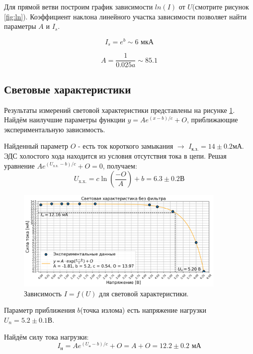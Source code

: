 \documentclass[a4paper, 12pt]{extarticle}
\begin{document}
Для прямой ветви построим график зависимости $ln(I)$ от $U$(смотрите рисунок \ref{fig:ln}).
Коэффициент наклона линейного участка зависимости позволяет найти параметры $A$ и $I_{s}$.

$$
I_{s} = e^{b} \sim 6 \text{ мкА}
$$

$$
A = \frac{1}{0.025 a} \sim 85.1
$$

\subsection*{\textcolor{sub_header}{Световые характеристики}}


Результаты измерений световой характеристики представлены на рисунке \ref{fig:light_straight}. Найдём наилучшие параметры функции $y = A e^{(x - b) / c} + O$, приближающие экспериментальную зависимость. 


Найденный параметр $O$ - есть ток короткого замыкания $\to$ $I_{\text{к.з.}} = 14 \pm 0.2 \text{мА}$. 
ЭДС холостого хода находится из условия отсутствия тока в цепи. Решая уравнение $A e^{(U_{\text{x.x.}} - b) / c} + O = 0$, получаем:
\begin{equation}
    U_{\text{x.x.}} = c \operatorname{ln}(\frac{-O}{A}) + b = 6.3 \pm 0.2 \text{В}
    \label{uxx}
\end{equation}




\begin{figure}[!hbtp]
    \centering
    \includegraphics[width = 0.9\textwidth]{pics/no_filter.png}
    \caption{Зависимость $I = f(U)$ для световой характеристики.}
    \label{fig:light_straight}
\end{figure}


Параметр приближения $b$(точка излома) есть напряжение нагрузки $U_n = 5.2 \pm 0.1 \text{В}$.

Найдём силу тока нагрузки:
\begin{equation}
    I_{\text{н}} = A e^{(U_{\text{н}} - b) / c} + O = A + O =  12.2 \pm 0.2 \text{ мА}
    \label{in}
\end{equation}
\end{document}
